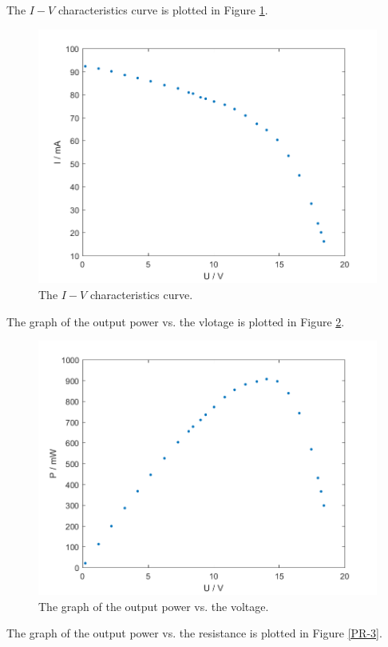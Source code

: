 The $I-V$ characteristics curve is plotted in Figure \ref{IV-3}.
\begin{figure}[H]
\centering
\includegraphics[scale=0.6]{IV3.png}
\caption{The $I-V$ characteristics curve.}
\label{IV-3}
\end{figure}
The graph of the output power vs. the vlotage is plotted in Figure \ref{PV-3}.
\begin{figure}[H]
\centering
\includegraphics[scale=0.6]{PV3.png}
\caption{The graph of the output power vs. the voltage.}
\label{PV-3}
\end{figure}
The graph of the output power vs. the resistance is plotted in Figure \ref{PR-3}.

